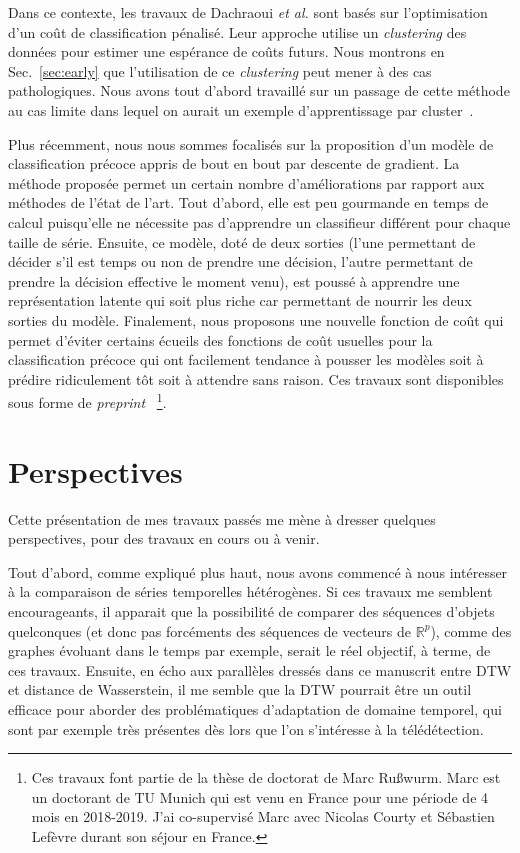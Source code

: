 Dans ce contexte, les travaux de Dachraoui \emph{et al.} sont basés sur
l'optimisation d'un coût de classification
pénalisé.
Leur approche utilise un \emph{clustering} des données pour estimer une
espérance de coûts futurs.
Nous montrons en Sec.~\ref{sec:early} que l'utilisation de ce \emph{clustering}
peut mener à des cas pathologiques.
Nous avons tout d'abord travaillé sur un passage de cette méthode au cas limite
dans lequel on aurait un exemple d'apprentissage par
cluster~\cite{tavenard:halshs-01339007}.

Plus récemment, nous nous sommes focalisés sur la proposition d'un modèle de
classification précoce appris de bout en bout par descente de gradient.
La méthode proposée permet un certain nombre d'améliorations par rapport aux
méthodes de l'état de l'art.
Tout d'abord, elle est peu gourmande en temps de calcul puisqu'elle ne
nécessite pas d'apprendre un classifieur différent pour chaque taille de série.
Ensuite, ce modèle, doté de deux sorties (l'une permettant de décider s'il est
temps ou non de prendre une décision, l'autre permettant de prendre la décision
effective le moment venu), est poussé à apprendre une représentation latente
qui soit plus riche car permettant de nourrir les deux sorties du modèle.
Finalement, nous proposons une nouvelle fonction de coût qui permet d'éviter
certains écueils des fonctions de coût usuelles pour la classification précoce
qui ont facilement tendance à pousser les modèles soit à prédire ridiculement
tôt soit à attendre sans raison.
Ces travaux sont disponibles sous forme de
\emph{preprint}~\cite{ruwurm:hal-02174314}%
\footnote{Ces travaux font partie de la thèse de doctorat de Marc Rußwurm.
Marc est un doctorant de TU Munich qui est venu en France pour une période de
4 mois en 2018-2019. J'ai co-supervisé Marc avec Nicolas Courty
et Sébastien Lefèvre durant son séjour en France.}.

\section*{Perspectives}

Cette présentation de mes travaux passés me mène à dresser quelques
perspectives, pour des travaux en cours ou à venir.

Tout d'abord, comme expliqué plus haut, nous avons commencé à nous intéresser à
la comparaison de séries temporelles hétérogènes. Si ces travaux me semblent
encourageants, il apparait que la possibilité de comparer des séquences d'objets
quelconques (et donc pas forcéments des séquences de vecteurs de
$\mathbb{R}^p$), comme des graphes évoluant dans le temps par exemple, serait
le réel objectif, à terme, de ces travaux.
Ensuite, en écho aux parallèles dressés dans ce manuscrit entre DTW et distance
de Wasserstein, il me semble que la DTW pourrait être un outil efficace pour
aborder des problématiques d'adaptation de domaine temporel, qui sont par
exemple très présentes dès lors que l'on s'intéresse à la télédétection.

